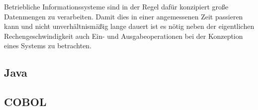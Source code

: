 Betriebliche Informationssysteme sind in der Regel dafür konzipiert große Datenmengen zu verarbeiten. Damit dies in einer angemessenen Zeit passieren kann und nicht unverhältnismäßig lange dauert ist es nötig neben der eigentlichen Rechengeschwindigkeit auch Ein- und Ausgabeoperationen bei der Konzeption eines Systems zu betrachten.
\subsection*{Java}
\subsection*{COBOL}